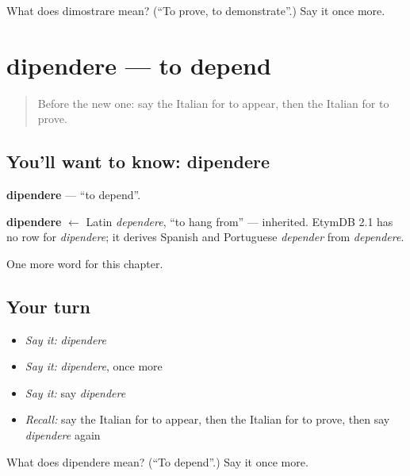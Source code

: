 \begin{tcolorbox}[breakable,colback=teal!4,colframe=teal!35!black,title={Before you move on}]
What does dimostrare mean? (\textquotedblleft{}To prove, to demonstrate\textquotedblright{}.) Say it once more.
\end{tcolorbox}
\section[dipendere]{dipendere — to depend}

\label{lesson:IT-C179-dipendere}



\begin{quote}
Before the new one: say the Italian for to appear, then the Italian for to prove.
\end{quote}

\subsection*{You'll want to know: dipendere}
\textbf{dipendere} — \textquotedblleft{}to depend\textquotedblright{}.

\begin{cousinweb}
\textbf{dipendere} $\leftarrow$ Latin \emph{dependere}, \textquotedblleft{}to hang from\textquotedblright{} — inherited. EtymDB 2.1 has no row for \emph{dipendere}; it derives Spanish and Portuguese \emph{depender} from \emph{dependere}.
\end{cousinweb}

\begin{grammarlens}[title={What you've built}]
One more word for this chapter.
\end{grammarlens}

\subsection*{Your turn}
\begin{itemize}
\raggedright
  \item \emph{Say it:} \emph{dipendere}
  \item \emph{Say it:} \emph{dipendere}, once more
  \item \emph{Say it:} say \emph{dipendere}
  \item \emph{Recall:} say the Italian for to appear, then the Italian for to prove, then say \emph{dipendere} again
\end{itemize}

\begin{tcolorbox}[breakable,colback=teal!4,colframe=teal!35!black,title={Before you move on}]
What does dipendere mean? (\textquotedblleft{}To depend\textquotedblright{}.) Say it once more.
\end{tcolorbox}
